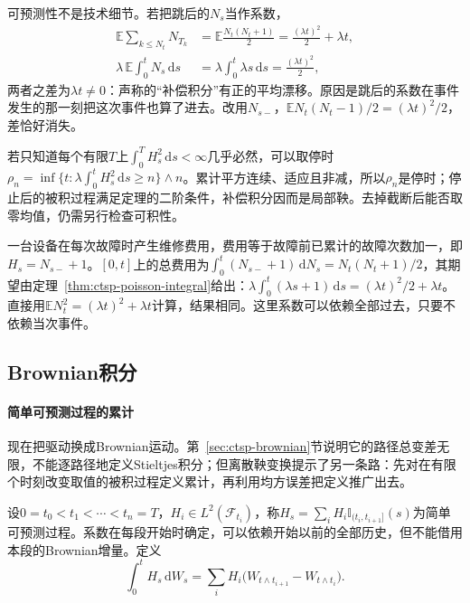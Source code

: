 可预测性不是技术细节。若把跳后的$N_s$当作系数，
\[
  \begin{aligned}
    \mathbb E\sum_{k\leq N_t}N_{T_k}&=\mathbb E\frac{N_t(N_t+1)}2=\frac{(\lambda t)^2}2+\lambda t,\\
    \lambda\,\mathbb E\int_0^tN_s\,\mathrm ds&=\lambda\int_0^t\lambda s\,\mathrm ds=\frac{(\lambda t)^2}2,
  \end{aligned}
\]
两者之差为$\lambda t\neq0$：声称的“补偿积分”有正的平均漂移。原因是跳后的系数在事件发生的那一刻把这次事件也算了进去。改用$N_{s-}$，$\mathbb EN_t(N_t-1)/2=(\lambda t)^2/2$，差恰好消失。

若只知道每个有限$T$上$\int_0^TH_s^2\,\mathrm ds<\infty$几乎必然，可以取停时$\rho_n=\inf\{t:\lambda\int_0^tH_s^2\,\mathrm ds\geq n\}\wedge n$。累计平方连续、适应且非减，所以$\rho_n$是停时；停止后的被积过程满足定理的二阶条件，补偿积分因而是局部鞅。去掉截断后能否取零均值，仍需另行检查可积性。

\begin{example}[按跳前状态计费]
  \label{ex:ctsp-predictable-fee}
  一台设备在每次故障时产生维修费用，费用等于故障前已累计的故障次数加一，即$H_s=N_{s-}+1$。$[0,t]$上的总费用为$\int_0^t(N_{s-}+1)\,\mathrm dN_s=N_t(N_t+1)/2$，其期望由定理~\ref{thm:ctsp-poisson-integral}给出：$\lambda\int_0^t(\lambda s+1)\,\mathrm ds=(\lambda t)^2/2+\lambda t$。直接用$\mathbb EN_t^2=(\lambda t)^2+\lambda t$计算，结果相同。这里系数可以依赖全部过去，只要不依赖当次事件。
\end{example}

\subsection{Brownian积分}
\label{sec:ctsp-brownian-integral}

\paragraph{简单可预测过程的累计}
现在把驱动换成Brownian运动。第~\ref{sec:ctsp-brownian}节说明它的路径总变差无限，不能逐路径地定义Stieltjes积分；但离散鞅变换提示了另一条路：先对在有限个时刻改变取值的被积过程定义累计，再利用均方误差把定义推广出去。

设$0=t_0<t_1<\cdots<t_n=T$，$H_i\in L^2(\mathcal F_{t_i})$，称$H_s=\sum_iH_i\mathbb I_{(t_i,t_{i+1}]}(s)$为简单可预测过程。系数在每段开始时确定，可以依赖开始以前的全部历史，但不能借用本段的Brownian增量。定义
\begin{equation}
  \int_0^tH_s\,\mathrm dW_s=\sum_iH_i\bigl(W_{t\wedge t_{i+1}}-W_{t\wedge t_i}\bigr).
  \label{eq:ctsp-simple-ito}
\end{equation}

